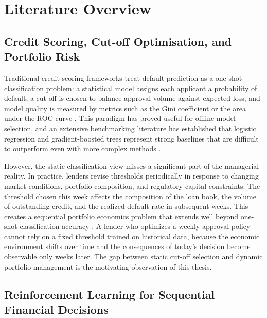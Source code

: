 \documentclass[12pt,a4paper]{article}
\begin{document}
\bigskip
\noindent\setlength{\fboxsep}{10pt}%

\section{Literature Overview}

\subsection{Credit Scoring, Cut-off Optimisation, and Portfolio Risk}

Traditional credit-scoring frameworks treat default prediction as a one-shot classification problem: a statistical model assigns each applicant a probability of default, a cut-off is chosen to balance approval volume against expected loss, and model quality is measured by metrics such as the Gini coefficient or the area under the ROC curve \cite{thomas2017, hand1997, siddiqi2006}. This paradigm has proved useful for offline model selection, and an extensive benchmarking literature has established that logistic regression and gradient-boosted trees represent strong baselines that are difficult to outperform even with more complex methods \cite{lessmann2015, baesens2003}.

However, the static classification view misses a significant part of the managerial reality. In practice, lenders revise thresholds periodically in response to changing market conditions, portfolio composition, and regulatory capital constraints. The threshold chosen this week affects the composition of the loan book, the volume of outstanding credit, and the realized default rate in subsequent weeks. This creates a sequential portfolio economics problem that extends well beyond one-shot classification accuracy \cite{bellotti2009}. A lender who optimizes a weekly approval policy cannot rely on a fixed threshold trained on historical data, because the economic environment shifts over time and the consequences of today's decision become observable only weeks later. The gap between static cut-off selection and dynamic portfolio management is the motivating observation of this thesis.

\subsection{Reinforcement Learning for Sequential Financial Decisions}
\end{document}
